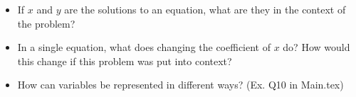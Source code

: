 \documentclass{article}
\begin{document}
\begin{itemize}

	\item{If $x$ and $y$ are the solutions to an equation, what are they in the context of the problem? }
	\item{In a single equation, what does changing the coefficient of $x$ do? How would this change if this problem was put into context?}
	\item{How can variables be represented in different ways? (Ex. Q10 in Main.tex)}

\end{itemize}
\end{document}
